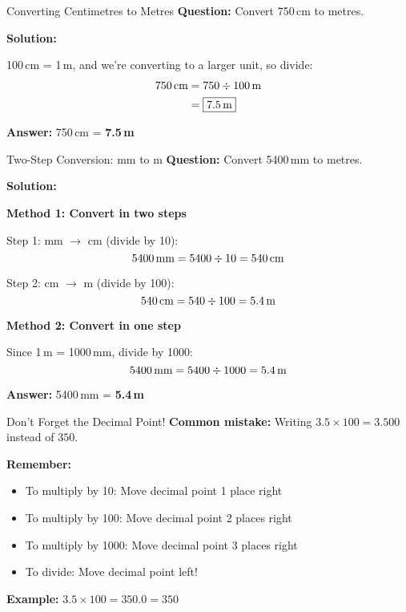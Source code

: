 \documentclass[12pt,a4paper]{article}
\begin{document}
\begin{examplebox}{Converting Centimetres to Metres}
\textbf{Question:} Convert 750\,cm to metres.

\textbf{Solution:}

100\,cm = 1\,m, and we're converting to a larger unit, so divide:
\begin{align*}
750\text{\,cm} &= 750 \div 100\text{\,m} \\
&= \boxed{7.5\text{\,m}}
\end{align*}

\textbf{Answer:} 750\,cm = \textbf{7.5\,m}
\end{examplebox}

\begin{examplebox}{Two-Step Conversion: mm to m}
\textbf{Question:} Convert 5400\,mm to metres.

\textbf{Solution:}

\textbf{Method 1: Convert in two steps}

Step 1: mm $\to$ cm (divide by 10):
\[5400\text{\,mm} = 5400 \div 10 = 540\text{\,cm}\]

Step 2: cm $\to$ m (divide by 100):
\[540\text{\,cm} = 540 \div 100 = 5.4\text{\,m}\]

\textbf{Method 2: Convert in one step}

Since 1\,m = 1000\,mm, divide by 1000:
\[5400\text{\,mm} = 5400 \div 1000 = 5.4\text{\,m}\]

\textbf{Answer:} 5400\,mm = \textbf{5.4\,m}
\end{examplebox}

\begin{warningbox}{Don't Forget the Decimal Point!}
\textbf{Common mistake:} Writing $3.5 \times 100 = 3.500$ instead of $350$.

\textbf{Remember:}
\begin{itemize}[leftmargin=*]
\item To multiply by 10: Move decimal point 1 place right
\item To multiply by 100: Move decimal point 2 places right
\item To multiply by 1000: Move decimal point 3 places right
\item To divide: Move decimal point left!
\end{itemize}

\textbf{Example:} $3.5 \times 100 = 350.0 = 350$
\end{warningbox}
\end{document}
